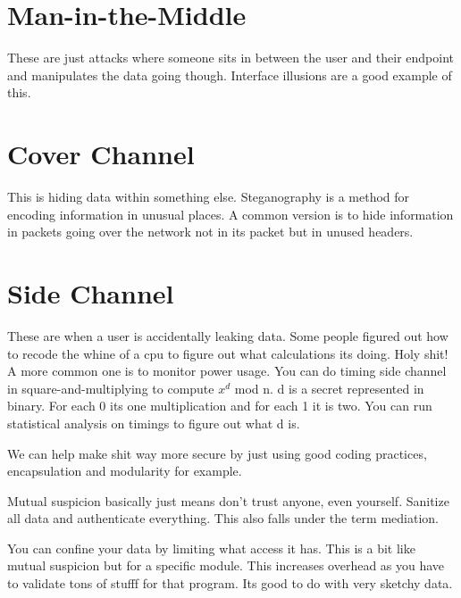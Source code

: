 \documentclass{article}
\begin{document}
\section{Man-in-the-Middle} %
\label{sec:man_in_the_middle}
These are just attacks where someone sits in between the user and their endpoint and manipulates the data going though. Interface illusions are a good example of this.


\section{Cover Channel} %
\label{sec:cover_channel}
This is hiding data within something else. Steganography is a method for encoding information in unusual places. A common version is to hide information in packets going over the network not in its packet but in unused headers. 


\section{Side Channel} %
\label{sec:side_channel}
These are when a user is accidentally leaking data. Some people figured out how to recode the whine of a cpu to figure out what calculations its doing. Holy shit! A more common one is to monitor power usage. You can do timing side channel in square-and-multiplying to compute $x^d$ mod n. d is a secret represented in binary. For each 0 its one multiplication and for each 1 it is two. You can run statistical analysis on timings to figure out what d is. 



We can help make shit way more secure by just using good coding practices, encapsulation and modularity for example.

Mutual suspicion basically just means don't trust anyone, even yourself. Sanitize all data and authenticate everything. This also falls under the term mediation.


You can confine your data by limiting what access it has. This is a bit like mutual suspicion but for a specific module. This increases overhead as you have to validate tons of stufff for that program. Its good to do with very sketchy data.
\end{document}
